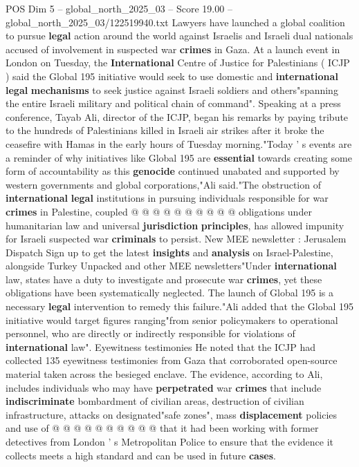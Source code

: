 \begin{textsample}{POS Dim 5 – global\_north\_2025\_03 – Score 19.00 – global\_north\_2025\_03/122519940.txt}  \label{ex:f5_pos_154}
Lawyers have launched a global coalition to pursue \textbf{legal} action around the world against Israelis and Israeli dual nationals accused of involvement in suspected war \textbf{crimes} in Gaza.
At a launch event in London on Tuesday, the \textbf{International} Centre of Justice for Palestinians ( ICJP ) said the Global 195 initiative would seek to use domestic and \textbf{international} \textbf{legal} \textbf{mechanisms} to seek justice against Israeli soldiers and others"spanning the entire Israeli military and political chain of command".
Speaking at a press conference, Tayab Ali, director of the ICJP, began his remarks by paying tribute to the hundreds of Palestinians killed in Israeli air strikes after it broke the ceasefire with Hamas in the early hours of Tuesday morning."Today ' s events are a reminder of why initiatives like Global 195 are \textbf{essential} towards creating some form of accountability as this \textbf{genocide} continued unabated and supported by western governments and global corporations,"Ali said."The obstruction of \textbf{international} \textbf{legal} institutions in pursuing individuals responsible for war \textbf{crimes} in Palestine, coupled @ @ @ @ @ @ @ @ @ @ obligations under humanitarian law and universal \textbf{jurisdiction} \textbf{principles}, has allowed impunity for Israeli suspected war \textbf{criminals} to persist.
New MEE newsletter : Jerusalem Dispatch Sign up to get the latest \textbf{insights} and \textbf{analysis} on Israel-Palestine, alongside Turkey Unpacked and other MEE newsletters"Under \textbf{international} law, states have a duty to investigate and prosecute war \textbf{crimes}, yet these obligations have been systematically neglected.
The launch of Global 195 is a necessary \textbf{legal} intervention to remedy this failure."Ali added that the Global 195 initiative would target figures ranging"from senior policymakers to operational personnel, who are directly or indirectly responsible for violations of \textbf{international} law".
Eyewitness testimonies He noted that the ICJP had collected 135 eyewitness testimonies from Gaza that corroborated open-source material taken across the besieged enclave.
The evidence, according to Ali, includes individuals who may have \textbf{perpetrated} war \textbf{crimes} that include \textbf{indiscriminate} bombardment of civilian areas, destruction of civilian infrastructure, attacks on designated"safe zones", mass \textbf{displacement} policies and use of @ @ @ @ @ @ @ @ @ @ that it had been working with former detectives from London ' s Metropolitan Police to ensure that the evidence it collects meets a high standard and can be used in future \textbf{cases}.

\end{textsample}
